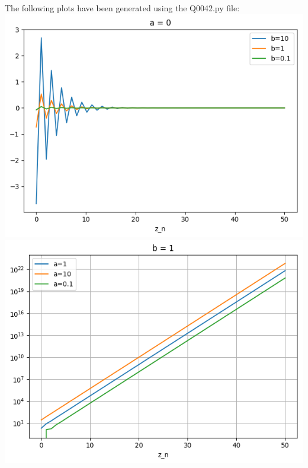 The following plots have been generated using the Q0042.py file:\\
\includegraphics[width=\linewidth]{aPlots.png}
\includegraphics[width=\linewidth]{bPlots.png}
